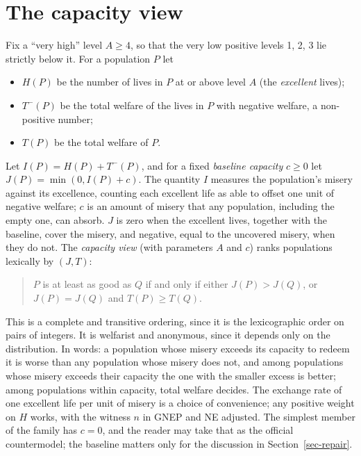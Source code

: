 \documentclass[
  11pt,
  letterpaper,
  DIV=11,
  numbers=noendperiod,
  twoside]{scrartcl}
\providecommand{\tightlist}{%
  \setlength{\itemsep}{0pt}\setlength{\parskip}{0pt}}
\begin{document}
\section{The capacity view}\label{sec-capacity}

Fix a ``very high'' level \(A \geq 4\), so that the very low positive
levels 1, 2, 3 lie strictly below it. For a population \(P\) let

\begin{itemize}
\tightlist
\item
  \(H(P)\) be the number of lives in \(P\) at or above level \(A\) (the
  \emph{excellent} lives);
\item
  \(T^-(P)\) be the total welfare of the lives in \(P\) with negative
  welfare, a non-positive number;
\item
  \(T(P)\) be the total welfare of \(P\).
\end{itemize}

Let \(I(P) = H(P) + T^-(P)\), and for a fixed \emph{baseline capacity}
\(c \geq 0\) let \(J(P) = \min(0, I(P) + c)\). The quantity \(I\)
measures the population's misery against its excellence, counting each
excellent life as able to offset one unit of negative welfare; \(c\) is
an amount of misery that any population, including the empty one, can
absorb. \(J\) is zero when the excellent lives, together with the
baseline, cover the misery, and negative, equal to the uncovered misery,
when they do not. The \emph{capacity view} (with parameters \(A\) and
\(c\)) ranks populations lexically by \((J, T)\):

\begin{quote}
\(P\) is at least as good as \(Q\) if and only if either
\(J(P) > J(Q)\), or \(J(P) = J(Q)\) and \(T(P) \geq T(Q)\).
\end{quote}

This is a complete and transitive ordering, since it is the
lexicographic order on pairs of integers. It is welfarist and anonymous,
since it depends only on the distribution. In words: a population whose
misery exceeds its capacity to redeem it is worse than any population
whose misery does not, and among populations whose misery exceeds their
capacity the one with the smaller excess is better; among populations
within capacity, total welfare decides. The exchange rate of one
excellent life per unit of misery is a choice of convenience; any
positive weight on \(H\) works, with the witness \(n\) in GNEP and NE
adjusted. The simplest member of the family has \(c = 0\), and the
reader may take that as the official countermodel; the baseline matters
only for the discussion in Section~\ref{sec-repair}.
\end{document}
